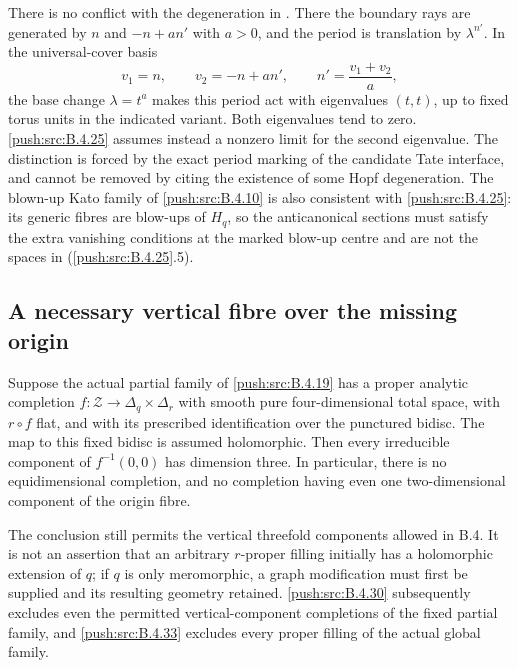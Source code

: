 \begin{remark}
There is no conflict with the degeneration in
\citet[Section 13, pp.~116--118]{Oda1978D}.
There the boundary rays are generated by $n$ and
$-n+a n'$ with $a>0$, and the period is translation
by $\lambda^{n'}$. In the universal-cover basis
\[
 v_1=n,\qquad v_2=-n+a n',\qquad
 n'=\frac{v_1+v_2}{a},
\]
the base change $\lambda=t^a$ makes this period
act with eigenvalues $(t,t)$, up to fixed torus
units in the indicated variant. Both eigenvalues
tend to zero. \ref{push:src:B.4.25} assumes instead a nonzero
limit for the second eigenvalue. The distinction
is forced by the exact period marking of the
candidate Tate interface, and cannot be removed
by citing the existence of some Hopf degeneration.
The blown-up Kato family of \ref{push:src:B.4.10} is also consistent
with \ref{push:src:B.4.25}: its generic fibres are blow-ups of
$H_q$, so the anticanonical sections must satisfy
the extra vanishing conditions at the marked
blow-up centre and are not the spaces in
(\ref{push:src:B.4.25}.5).
\end{remark}


\subsection{A necessary vertical fibre over the missing origin}

\begin{proposition}\label{push:src:B.4.26}
\label{push:B426}
Suppose the actual partial family of \ref{push:src:B.4.19} has a
proper analytic completion $f:\mathcal Z\to\Delta_q\times\Delta_r$
with smooth pure four-dimensional total space, with
$r\circ f$ flat, and with its prescribed identification
over the punctured bidisc. The map to this fixed bidisc
is assumed holomorphic. Then every irreducible component
of $f^{-1}(0,0)$ has dimension three. In particular,
there is no equidimensional completion, and no completion
having even one two-dimensional component of the origin
fibre.

The conclusion still permits the vertical threefold
components allowed in B.4. It is not an assertion that
an arbitrary $r$-proper filling initially has a holomorphic
extension of $q$; if $q$ is only meromorphic, a graph
modification must first be supplied and its resulting
geometry retained. \ref{push:src:B.4.30} subsequently excludes even
the permitted vertical-component completions of the
fixed partial family, and \ref{push:src:B.4.33} excludes every proper
filling of the actual global family.
\end{proposition}


